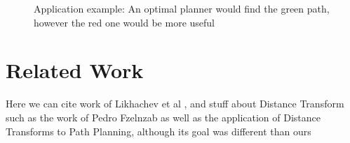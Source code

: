 \documentclass[graybox]{svmult}
\begin{document}
\begin{figure}[]
		\centering
          \caption{Application example: An optimal planner would find the green path, however the red one would be more useful}
          \label{fig:Introduction1}
\end{figure}


\section{Related Work}
\label{sec:RelatedWork}
Here we can cite work of Likhachev et al \cite{Bhattacharya2011Homotopy3D}, and stuff about Distance Transform such as the work of Pedro Fzelnzab as well as the application of Distance Transforms to Path Planning, although its goal was different than ours
\end{document}
